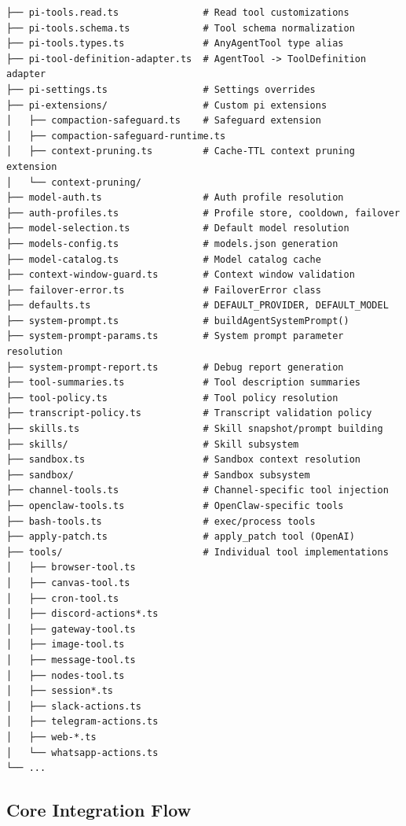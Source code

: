 \begin{lstlisting}
├── pi-tools.read.ts               # Read tool customizations
├── pi-tools.schema.ts             # Tool schema normalization
├── pi-tools.types.ts              # AnyAgentTool type alias
├── pi-tool-definition-adapter.ts  # AgentTool -> ToolDefinition adapter
├── pi-settings.ts                 # Settings overrides
├── pi-extensions/                 # Custom pi extensions
│   ├── compaction-safeguard.ts    # Safeguard extension
│   ├── compaction-safeguard-runtime.ts
│   ├── context-pruning.ts         # Cache-TTL context pruning extension
│   └── context-pruning/
├── model-auth.ts                  # Auth profile resolution
├── auth-profiles.ts               # Profile store, cooldown, failover
├── model-selection.ts             # Default model resolution
├── models-config.ts               # models.json generation
├── model-catalog.ts               # Model catalog cache
├── context-window-guard.ts        # Context window validation
├── failover-error.ts              # FailoverError class
├── defaults.ts                    # DEFAULT_PROVIDER, DEFAULT_MODEL
├── system-prompt.ts               # buildAgentSystemPrompt()
├── system-prompt-params.ts        # System prompt parameter resolution
├── system-prompt-report.ts        # Debug report generation
├── tool-summaries.ts              # Tool description summaries
├── tool-policy.ts                 # Tool policy resolution
├── transcript-policy.ts           # Transcript validation policy
├── skills.ts                      # Skill snapshot/prompt building
├── skills/                        # Skill subsystem
├── sandbox.ts                     # Sandbox context resolution
├── sandbox/                       # Sandbox subsystem
├── channel-tools.ts               # Channel-specific tool injection
├── openclaw-tools.ts              # OpenClaw-specific tools
├── bash-tools.ts                  # exec/process tools
├── apply-patch.ts                 # apply_patch tool (OpenAI)
├── tools/                         # Individual tool implementations
│   ├── browser-tool.ts
│   ├── canvas-tool.ts
│   ├── cron-tool.ts
│   ├── discord-actions*.ts
│   ├── gateway-tool.ts
│   ├── image-tool.ts
│   ├── message-tool.ts
│   ├── nodes-tool.ts
│   ├── session*.ts
│   ├── slack-actions.ts
│   ├── telegram-actions.ts
│   ├── web-*.ts
│   └── whatsapp-actions.ts
└── ...
\end{lstlisting}


\subsection{Core Integration Flow}


